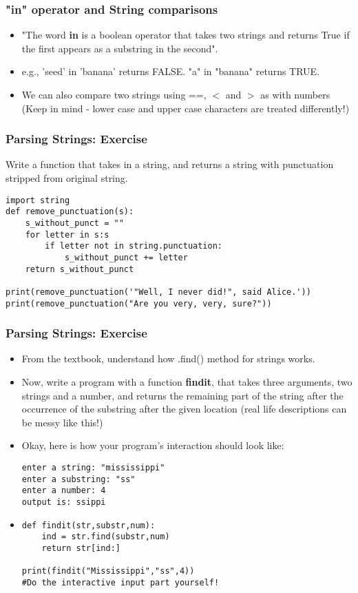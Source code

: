 \documentclass{beamer}
\begin{document}
\begin{frame}
\frametitle{"in" operator and String comparisons}
\begin{itemize}
\item "The word \textbf{in} is a boolean operator that takes two strings and returns True if the first appears as a substring in the second".
\item e.g., 'seed' in 'banana' returns FALSE. "a" in "banana" returns TRUE. \pause
\item We can also compare two strings using ==, $<$ and $>$ as with numbers (Keep in mind - lower case and upper case characters are treated differently!)
\end{itemize}
\end{frame}

\begin{frame}[fragile]
\frametitle{Parsing Strings: Exercise}
Write a function that takes in  a string, and returns a string with punctuation stripped from original string.\pause
\scriptsize 
\begin{verbatim}
import string
def remove_punctuation(s):
    s_without_punct = ""
    for letter in s:s
        if letter not in string.punctuation:
            s_without_punct += letter
    return s_without_punct

print(remove_punctuation('"Well, I never did!", said Alice.'))
print(remove_punctuation("Are you very, very, sure?"))
\end{verbatim}
\end{frame}

\begin{frame}[fragile]
\frametitle{Parsing Strings: Exercise}
\begin{itemize}
\item From the textbook, understand how .find() method for strings works. 
\item Now, write a program with a function \textbf{findit}, that takes three arguments, two strings and a number, and returns the remaining part of the string after the occurrence of the substring after the given location 
(real life descriptions can be messy like this!) \pause
\item Okay, here is how your program's interaction should look like: \scriptsize
\begin{verbatim}
enter a string: "mississippi"
enter a substring: "ss"
enter a number: 4
output is: ssippi
\end{verbatim} \pause
\item \begin{verbatim}
def findit(str,substr,num):
    ind = str.find(substr,num)
    return str[ind:]

print(findit("Mississippi","ss",4)) 
#Do the interactive input part yourself! 
\end{verbatim}
\end{itemize}
\end{frame}
\end{document}
